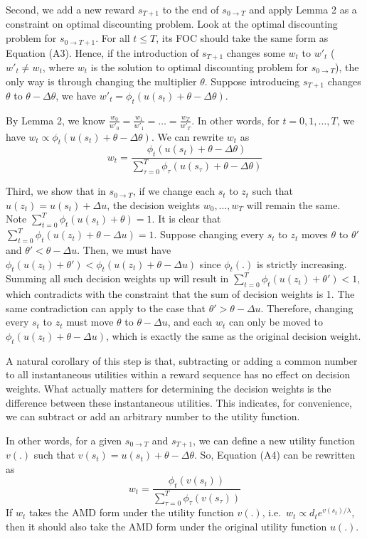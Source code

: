 \documentclass[
  12pt,
]{article}
\begin{document}
Second, we add a new reward \(s_{T+1}\) to the end of
\(s_{0\rightarrow T}\) and apply Lemma 2 as a constraint on optimal
discounting problem. Look at the optimal discounting problem for
\(s_{0\rightarrow T+1}\). For all \(t\leq T\), its FOC should take the
same form as Equation (A3). Hence, if the introduction of \(s_{T+1}\)
changes some \(w_t\) to \(w'_t\) (\(w'_t \neq w_t\), where \(w_t\) is
the solution to optimal discounting problem for \(s_{0\rightarrow T}\)),
the only way is through changing the multiplier \(\theta\). Suppose
introducing \(s_{T+1}\) changes \(\theta\) to \(\theta-\Delta \theta\),
we have \(w'_t = \phi_t(u(s_t)+\theta-\Delta \theta)\).

By Lemma 2, we know
\(\frac{w_0}{w'_0}=\frac{w_1}{w'_1}=…=\frac{w_T}{w'_T}\). In other
words, for \(t=0,1,…,T\), we have
\(w_t \propto \phi_t(u(s_t)+\theta-\Delta \theta)\). We can rewrite
\(w_t\) as \[\tag{A4}
w_t = \frac{\phi_t(u(s_t)+\theta-\Delta \theta)}{\sum_{\tau=0}^{T}\phi_\tau(u(s_\tau)+\theta-\Delta \theta)}
\]

Third, we show that in \(s_{0\rightarrow T}\), if we change each \(s_t\)
to \(z_t\) such that \(u(z_t)=u(s_t)+\Delta u\), the decision weights
\(w_0,…,w_T\) will remain the same. Note
\(\sum_{t=0}^T \phi_t(u(s_t)+\theta)=1\). It is clear that
\(\sum_{t=0}^T \phi_t(u(z_t)+\theta-\Delta u)=1\). Suppose changing
every \(s_t\) to \(z_t\) moves \(\theta\) to \(\theta'\) and
\(\theta'<\theta-\Delta u\). Then, we must have
\(\phi_t(u(z_t)+\theta')<\phi_t(u(z_t)+\theta-\Delta u)\) since
\(\phi_t(.)\) is strictly increasing. Summing all such decision weights
up will result in \(\sum_{t=0}^T \phi_t(u(z_t)+\theta')<1\), which
contradicts with the constraint that the sum of decision weights is 1.
The same contradiction can apply to the case that
\(\theta'>\theta-\Delta u\). Therefore, changing every \(s_t\) to
\(z_t\) must move \(\theta\) to \(\theta - \Delta u\), and each \(w_t\)
can only be moved to \(\phi_t(u(z_t)+\theta -\Delta u)\), which is
exactly the same as the original decision weight.

A natural corollary of this step is that, subtracting or adding a common
number to all instantaneous utilities within a reward sequence has no
effect on decision weights. What actually matters for determining the
decision weights is the difference between these instantaneous
utilities. This indicates, for convenience, we can subtract or add an
arbitrary number to the utility function.

In other words, for a given \(s_{0\rightarrow T}\) and \(s_{T+1}\), we
can define a new utility function \(v(.)\) such that
\(v(s_t) = u(s_t) +\theta-\Delta \theta\). So, Equation (A4) can be
rewritten as\[\tag{A5}
w_t = \frac{\phi_t(v(s_t))}{\sum_{\tau=0}^{T}\phi_\tau(v(s_\tau))}
\]If \(w_t\) takes the AMD form under the utility function \(v(.)\),
i.e.~\(w_t \propto d_t e^{v(s_t)/\lambda}\), then it should also take
the AMD form under the original utility function \(u(.)\).
\end{document}
